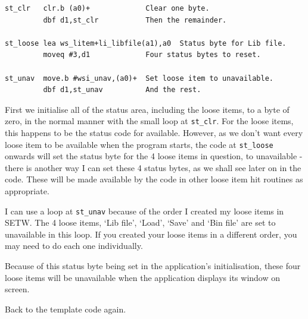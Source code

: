 \begin{lstlisting}[firstnumber=1,]
st_clr   clr.b (a0)+             Clear one byte.
         dbf d1,st_clr           Then the remainder.

st_loose lea ws_litem+li_libfile(a1),a0  Status byte for Lib file.
         moveq #3,d1             Four status bytes to reset.

st_unav  move.b #wsi_unav,(a0)+  Set loose item to unavailable.
         dbf d1,st_unav          And the rest.
\end{lstlisting}

First we initialise all of the status area, including the loose
    items, to a byte of zero, in the normal manner with the small loop at
 \texttt{st\_clr}. For the loose items, this happens to be the
    status code for available. However, as we don't want every loose item to
    be available when the program starts, the code at
 \texttt{st\_loose} onwards will set the status byte for the 4
    loose items in question, to unavailable -{} there is another way I can set
    these 4 status bytes, as we shall see later on in the code. These will be
    made available by the code in other loose item hit routines as
    appropriate.

I can use a loop at \texttt{st\_unav} because of the
    order I created my loose items in SETW. The 4
    loose items, `Lib file', `Load', `Save' and `Bin file' are set to
    unavailable in this loop. If you created your loose items in a different
    order, you may need to do each one individually.

Because of this status byte being set in the application's
    initialisation, these four loose items will be unavailable when the
    application displays its window on screen.

Back to the template code again.

